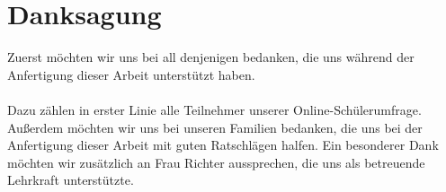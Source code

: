  
\vspace*{5cm}
\section*{Danksagung}
\vspace{1.7cm}
Zuerst möchten wir uns bei all denjenigen bedanken, die uns während der Anfertigung dieser Arbeit unterstützt haben. \\\\
Dazu zählen in erster Linie alle Teilnehmer unserer Online-Schülerumfrage. 
Außerdem möchten wir uns bei unseren Familien bedanken, die uns bei der Anfertigung dieser Arbeit mit guten Ratschlägen halfen.
Ein besonderer Dank möchten wir zusätzlich an Frau Richter aussprechen, die uns als betreuende Lehrkraft unterstützte.
\newpage
